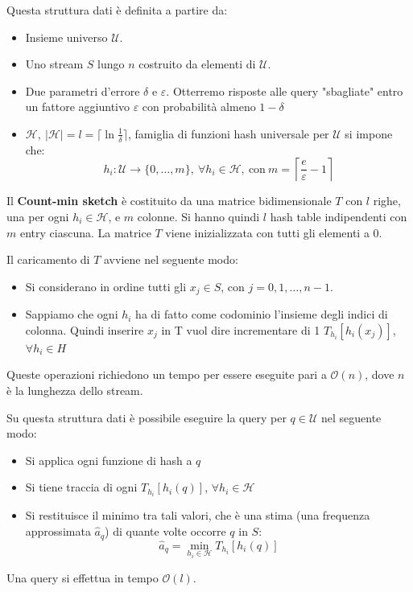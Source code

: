 Questa struttura dati è definita a partire da:
\begin{itemize}
    \item Insieme universo $\mathcal{U}$.
    \item Uno stream $S$ lungo $n$ costruito da elementi di $\mathcal{U}$.
    \item Due parametri d'errore $\delta$ e $\varepsilon$. Otterremo risposte
          alle query "sbagliate" entro un fattore aggiuntivo $\varepsilon$ con
          probabilità almeno $1 - \delta$
    \item $\mathcal{H}, \ |\mathcal{H}| = l = \lceil \ln \frac{1}{\delta} \rceil$,
          famiglia di funzioni hash universale per $\mathcal{U}$ si impone che:
          \begin{equation}
              h_i: \mathcal{U} \to \{0, \dots, m\}, \ \forall h_i \in \mathcal{H},
              \ \text{con} \ m = \left\lceil \frac{e}{\varepsilon} - 1 \right\rceil
          \end{equation}
\end{itemize}
Il \textbf{Count-min sketch} è costituito da una matrice bidimensionale $T$ con
$l$ righe, una per ogni $h_i \in \mathcal{H}$, e $m$ colonne. Si hanno quindi $l$
hash table indipendenti con $m$ entry ciascuna. La matrice $T$ viene inizializzata
con tutti gli elementi a $0$.

Il caricamento di $T$ avviene nel seguente modo:
\begin{itemize}
    \item Si considerano in ordine tutti gli $x_j \in S$, con $j = 0, 1, \dots,
              n - 1$.
    \item Sappiamo che ogni $h_i$ ha di fatto come codominio l'insieme degli indici
          di colonna. Quindi inserire $x_j$ in T vuol dire incrementare di 1
          $T_{h_i} [h_i(x_j)]$, $\forall h_i \in H$
\end{itemize}
Queste operazioni richiedono un tempo per essere eseguite pari a $\mathcal{O}(n)$,
dove $n$ è la lunghezza dello stream.

Su questa struttura dati è possibile eseguire la query per $q \in \mathcal{U}$
nel seguente modo:
\begin{itemize}
    \item Si applica ogni funzione di hash a $q$
    \item Si tiene traccia di ogni $T_{h_i} [h_i(q)]$, $\forall h_i \in \mathcal{H}$
    \item Si restituisce il minimo tra tali valori, che è una stima (una frequenza
          approssimata $\hat{a}_q$) di quante volte occorre $q$ in $S$:
          \begin{equation}
              \hat{a}_q = \min_{h_i \in \mathcal{H}} T_{h_i} [h_i(q)]
          \end{equation}
\end{itemize}
Una query si effettua in tempo $\mathcal{O}(l)$.

